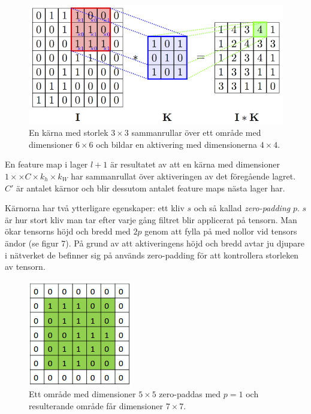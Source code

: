\documentclass[a4paper,11pt,twoside]{article}
\begin{document}
\begin{figure}[h]\label{figkonv}
	\centering
  		\includegraphics[scale=2.1]{convolution.png}
  	\caption{En kärna med storlek $3 \times 3$ sammanrullar över ett område med dimensioner $6 \times 6$ och bildar en aktivering med dimensionerna $4 \times 4$.}
\end{figure}

En feature map i lager $l+1$ är resultatet av att en kärna med dimensioner $1 \times \times C  \times k_h \times k_W$ har sammanrullat över aktiveringen av det föregående lagret. $C'$ är antalet kärnor och blir dessutom antalet feature maps nästa lager har.

Kärnorna har två ytterligare egenskaper: ett kliv $s$ och så kallad \textit{zero-padding} $p$. $s$ är hur stort kliv man tar efter varje gång filtret blir applicerat på tensorn. Man ökar tensorns höjd och bredd med $2p$ genom att fylla på med nollor vid tensors ändor (se figur 7). På grund av att aktiveringens höjd och bredd avtar ju djupare i nätverket de befinner sig på används zero-padding för att kontrollera storleken av tensorn.

\begin{figure}[h]\label{figzeropad}
	\centering
  		\includegraphics[scale=0.7]{zeropadding.png}
  	\caption{Ett område med dimensioner $5 \times 5$ zero-paddas med $p=1$ och resulterande område får dimensioner $7 \times 7$.}
\end{figure}
\end{document}

